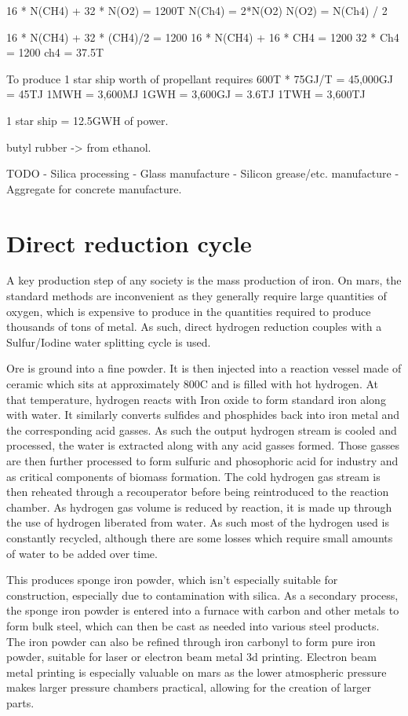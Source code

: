 \documentclass[10pt]{article}
\begin{document}
16 * N(CH4) + 32 * N(O2) = 1200T
N(Ch4) = 2*N(O2)
N(O2) = N(Ch4) / 2

16 * N(CH4) + 32 * (CH4)/2 = 1200
16 * N(CH4) + 16 * CH4 = 1200
32 * Ch4 = 1200
ch4 = 37.5T

To produce 1 star ship worth of propellant requires 600T * 75GJ/T = 45,000GJ = 45TJ
1MWH = 3,600MJ
1GWH = 3,600GJ = 3.6TJ
1TWH = 3,600TJ

1 star ship = 12.5GWH of power.


butyl rubber -> from ethanol.

TODO - Silica processing
- Glass manufacture
- Silicon grease/etc. manufacture
- Aggregate for concrete manufacture.


\section{Direct reduction cycle}
A key production step of any society is the mass production of iron. On mars, the standard methods are inconvenient as they generally require large quantities of oxygen, which is expensive to produce in the quantities required to produce thousands of tons of metal. As such, direct hydrogen reduction couples with a Sulfur/Iodine water splitting cycle is used.

Ore is ground into a fine powder. It is then injected into a reaction vessel made of ceramic which sits at approximately 800C and is filled with hot hydrogen. At that temperature, hydrogen reacts with Iron oxide to form standard iron along with water. It similarly converts sulfides and phosphides back into iron metal and the corresponding acid gasses. As such the output hydrogen stream is cooled and processed, the water is extracted along with any acid gasses formed. Those gasses are then further processed to form sulfuric and phosophoric acid for industry and as critical components of biomass formation. The cold hydrogen gas stream is then reheated through a recouperator before being reintroduced to the reaction chamber. As hydrogen gas volume is reduced by reaction, it is made up through the use of hydrogen liberated from water. As such most of the hydrogen used is constantly recycled, although there are some losses which require small amounts of water to be added over time.

This produces sponge iron powder, which isn't especially suitable for construction, especially due to contamination with silica. As a secondary process, the sponge iron powder is entered into a furnace with carbon and other metals to form bulk steel, which can then be cast as needed into various steel products. The iron powder can also be refined through iron carbonyl to form pure iron powder, suitable for laser or electron beam metal 3d printing. Electron beam metal printing is especially valuable on mars as the lower atmospheric pressure makes larger pressure chambers practical, allowing for the creation of larger parts.
\end{document}
